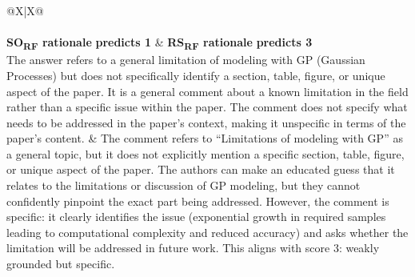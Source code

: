 \begin{table}[t]
\centering
\normalsize
\setlength{\tabcolsep}{7pt}
\renewcommand{\arraystretch}{1.3}
\begin{tabularx}{\textwidth}{@{}X|X@{}}
\toprule
{} \\
\midrule
{} \\
\midrule
{}
\textbf{SO\textsubscript{RF} rationale} \hfill \textbf{predicts 1} &
\textbf{RS\textsubscript{RF} rationale} \hfill \textbf{predicts 3} \\
The answer refers to a general limitation of modeling with GP
(Gaussian Processes) but does not specifically identify a section, table,
figure, or unique aspect of the paper. It is a general comment about a
known limitation in the field rather than a specific issue within the
paper. The comment does not specify what needs to be addressed in the
paper's context, making it unspecific in terms of the paper's content. &
The comment refers to ``Limitations of modeling with GP'' as a general
topic, but it does not explicitly mention a specific section, table,
figure, or unique aspect of the paper. The authors can make an educated
guess that it relates to the limitations or discussion of GP modeling,
but they cannot confidently pinpoint the exact part being addressed.
However, the comment is specific: it clearly identifies the issue
(exponential growth in required samples leading to computational
complexity and reduced accuracy) and asks whether the limitation will
be addressed in future work. This aligns with score 3: weakly grounded
but specific. \\
\end{tabularx}
\nopagebreak
\vspace{-2pt}
\begin{tabularx}{\textwidth}{@{}l
    >{\centering\arraybackslash}X
    >{\centering\arraybackslash}X
    >{\centering\arraybackslash}X
    >{\centering\arraybackslash}X@{}}

\end{tabularx}
\end{table}

